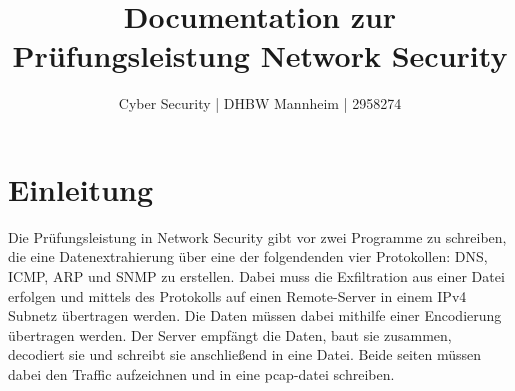 \documentclass[11pt,a4paper]{article}
\title{Documentation zur Prüfungsleistung Network Security}
\author{Cyber Security | DHBW Mannheim | 2958274}
\begin{document}
\maketitle
\section{Einleitung}
Die Prüfungsleistung in Network Security gibt vor zwei Programme zu schreiben,
die eine Datenextrahierung über eine der folgendenden vier Protokollen: DNS, ICMP,
ARP und SNMP zu erstellen. Dabei muss die Exfiltration aus einer Datei erfolgen und
mittels des Protokolls auf einen Remote-Server in einem IPv4 Subnetz übertragen werden.
Die Daten müssen dabei mithilfe einer Encodierung übertragen werden. Der Server empfängt
die Daten, baut sie zusammen, decodiert sie und schreibt sie anschließend in eine Datei.
Beide seiten müssen dabei den Traffic
aufzeichnen und in eine pcap-datei schreiben.
\end{document}
